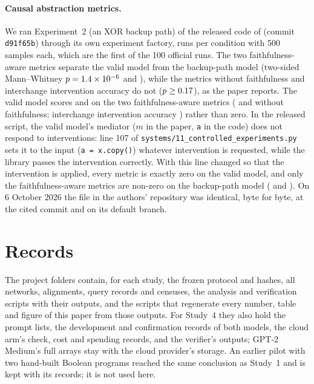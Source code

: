 \paragraph{Causal abstraction metrics.}
We ran Experiment~2 (an XOR backup path) of the released code of \citet{meloux2026validating} (commit
\texttt{d91f65b}) through its own experiment factory, \CaeRuns{} runs per condition with 500 samples each, which
are the first \CaeRuns{} of the 100 official runs. The two faithfulness-aware metrics separate the valid model from
the backup-path model (two-sided Mann--Whitney $p=1.4\times 10^{-6}$ and \CaePUp), while the metrics without faithfulness
and interchange intervention accuracy do not ($p\ge0.17$), as the paper reports. The valid model scores
\CaeValidDown{} and \CaeValidUp{} on the two faithfulness-aware metrics (\CaeValidDownNf{} and \CaeValidUpNf{} without
faithfulness; interchange intervention accuracy \CaeValidIia) rather than zero. In the released script, the valid
model's mediator ($m$ in the paper, \texttt{a} in the code) does not respond to interventions: line 107 of
\texttt{systems/11\_controlled\_experiments.py} sets it to the input (\texttt{a = x.copy()}) whatever intervention is
requested, while the library passes the intervention correctly. With this line changed so that the intervention is
applied, every metric is exactly zero on the valid model, and only the faithfulness-aware metrics are non-zero on the
backup-path model (\CaeFixedLeakDown{} and \CaeFixedLeakUp). On 6 October 2026 the file in the authors' repository
was identical, byte for byte, at the cited commit and on its default branch.

\section{Records}\label{app:records}

The project folders contain, for each study, the frozen protocol and hashes, all networks, alignments, query
records and censuses, the analysis and verification scripts with their outputs, and the scripts that regenerate
every number, table and figure of this paper from those outputs. For Study~4 they also hold the prompt lists, the
development and confirmation records of both models, the cloud arm's check, cost and spending records, and the
verifier's outputs; GPT-2 Medium's full arrays stay with the cloud provider's storage. An earlier pilot with two
hand-built Boolean programs reached the same conclusion as Study~1 and is kept with its records; it is not used here.

